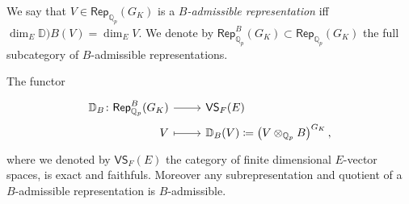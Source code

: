 \begin{defn}
	We say that $V \in \mathsf{Rep}_{\mathbb{Q}_p}(G_K)$ is a
	{\em $B$-admissible representation} iff 
	$\dim_E \mathbb{D})B(V) = \dim_E V$.
	We denote by $\mathsf{Rep}_{\mathbb{Q}_p}^B(G_K) \subset \mathsf{Rep}_{\mathbb{Q}_p}(G_K)$
	the full subcategory of $B$-admissible representations.
\end{defn}


\begin{prop}
	The functor
	\begin{equation*}
	\begin{tikzcd}[row sep = 0ex
		,/tikz/column 1/.append style={anchor=base east}
		,/tikz/column 2/.append style={anchor=base west}]
		\mathbb{D}_B\colon \mathsf{Rep}_{\mathbb{Q}_p}^B(G_K) \arrow[r, "", rightarrow] &
		\mathsf{VS}_F(E) \\
		V \arrow[r, "", mapsto] & 
		\mathbb{D}_B(V) \coloneqq \left( V \otimes_{\mathbb{Q}_p} B \right)^{G_K}
	,\end{tikzcd}
	\end{equation*} 
	where we denoted by $\mathsf{VS}_F(E)$ the category of finite dimensional $E$-vector spaces,
	is exact and faithfuls.
	Moreover any subrepresentation and quotient of a $B$-admissible
	representation is $B$-admissible.
\end{prop}
